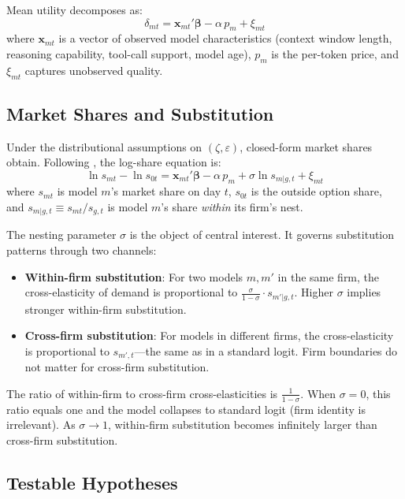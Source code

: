 \documentclass[11pt, a4paper]{article}
\begin{document}
Mean utility decomposes as:
\begin{equation}
\delta_{mt} = \mathbf{x}_{mt}'\boldsymbol{\beta} - \alpha \, p_m + \xi_{mt}
\label{eq:meanutil}
\end{equation}
where $\mathbf{x}_{mt}$ is a vector of observed model characteristics (context window length, reasoning capability, tool-call support, model age), $p_m$ is the per-token price, and $\xi_{mt}$ captures unobserved quality.

\subsection{Market Shares and Substitution}

Under the distributional assumptions on $(\zeta, \varepsilon)$, closed-form market shares obtain. Following \citet{berry1994estimating}, the log-share equation is:
\begin{equation}
\ln s_{mt} - \ln s_{0t} = \mathbf{x}_{mt}'\boldsymbol{\beta} - \alpha \, p_m + \sigma \ln s_{m|g,t} + \xi_{mt}
\label{eq:berry}
\end{equation}
where $s_{mt}$ is model $m$'s market share on day $t$, $s_{0t}$ is the outside option share, and $s_{m|g,t} \equiv s_{mt} / s_{g,t}$ is model $m$'s share \emph{within} its firm's nest.

The nesting parameter $\sigma$ is the object of central interest. It governs substitution patterns through two channels:

\begin{itemize}[nosep]
\item \textbf{Within-firm substitution}: For two models $m, m'$ in the same firm, the cross-elasticity of demand is proportional to $\frac{\sigma}{1-\sigma} \cdot s_{m'|g,t}$. Higher $\sigma$ implies stronger within-firm substitution.
\item \textbf{Cross-firm substitution}: For models in different firms, the cross-elasticity is proportional to $s_{m',t}$---the same as in a standard logit. Firm boundaries do not matter for cross-firm substitution.
\end{itemize}

The ratio of within-firm to cross-firm cross-elasticities is $\frac{1}{1-\sigma}$. When $\sigma = 0$, this ratio equals one and the model collapses to standard logit (firm identity is irrelevant). As $\sigma \to 1$, within-firm substitution becomes infinitely larger than cross-firm substitution.

\subsection{Testable Hypotheses}
\end{document}
